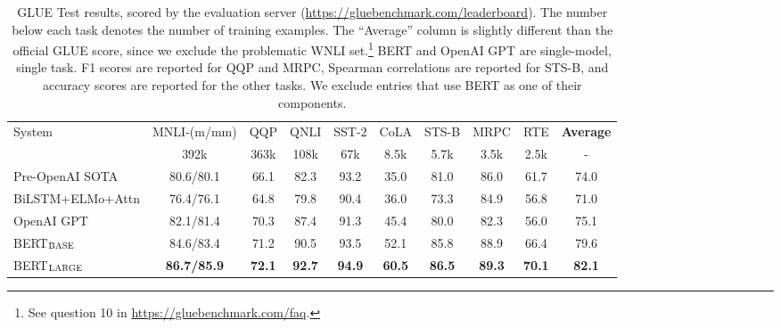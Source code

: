 \documentclass[11pt,a4paper]{article}
\newcommand\bertbase{BERT$_{\small \textsc{BASE}}$\xspace}
\newcommand\bertlarge{BERT$_{\small \textsc{LARGE}}$\xspace}
\begin{document}
\begin{table}[t]
\small
\renewcommand{\arraystretch}{1.2}
\begin{center}
 \begin{tabular*}{\textwidth}{l@{\extracolsep{\fill}}cccccccc c}
    \toprule
System             &  MNLI-(m/mm)    & QQP        & QNLI       & SST-2      & CoLA       & STS-B      & MRPC       & RTE        & {\bf Average} \\
                  & 392k            & 363k       & 108k       & 67k        & 8.5k       & 5.7k       & 3.5k       & 2.5k       & -          \\ 
\hline
Pre-OpenAI SOTA    & 80.6/80.1       & 66.1       & 82.3       & 93.2       & 35.0       & 81.0       & 86.0       & 61.7       & 74.0       \\
BiLSTM+ELMo+Attn   & 76.4/76.1       & 64.8       & 79.8       & 90.4       & 36.0       & 73.3       & 84.9       & 56.8       & 71.0       \\
OpenAI GPT         & 82.1/81.4       & 70.3       & 87.4       & 91.3       & 45.4       & 80.0       & 82.3       & 56.0       & 75.1       \\

\hline
\bertbase          & 84.6/83.4       & 71.2       & 90.5       & 93.5       & 52.1       & 85.8       & 88.9       & 66.4       & 79.6       \\
\bertlarge         & {\bf 86.7/85.9} & {\bf 72.1} & {\bf 92.7} & {\bf 94.9} & {\bf 60.5} & {\bf 86.5} & {\bf 89.3} & {\bf 70.1} & {\bf 82.1} \\
    \bottomrule
   \end{tabular*}
   \caption{GLUE Test results, scored by the evaluation server ({\small \url{https://gluebenchmark.com/leaderboard}}). The number below each task denotes the number of training examples. The ``Average'' column is slightly different than the official GLUE score, since we exclude the problematic WNLI set.\footnote{See question 10 in \url{https://gluebenchmark.com/faq}.} 
   BERT and OpenAI GPT are single-model, single task. F1 scores are reported for QQP and MRPC, Spearman correlations are reported for STS-B, and accuracy scores are reported for
   the other tasks. We exclude entries that use BERT as one of their components.}
   \label{tab:glue_official}
\end{center}
\end{table}
\end{document}
